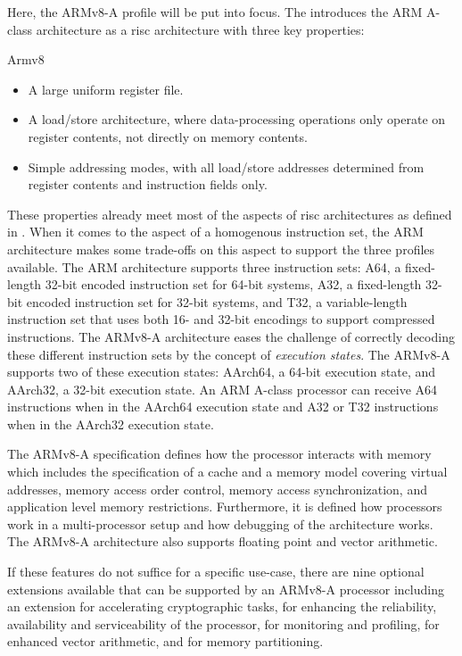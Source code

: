 Here, the ARMv8-A profile will be put into focus.
The  \cite{Armv8} introduces the ARM A-class architecture as a \gls{risc} architecture with three key properties:

\begin{displaycquote}[p.A1-34]{Armv8}
    \textelp{}
    \begin{itemize}
        \item A large uniform register file.
        \item A load/store architecture, where data-processing operations only operate on register contents, not directly on memory contents.
        \item Simple addressing modes, with all load/store addresses determined from register contents and instruction fields only.
    \end{itemize}
\end{displaycquote}

These properties already meet most of the aspects of \gls{risc} architectures as defined in \cite{Hennessy12}.
When it comes to the aspect of a homogenous instruction set, the ARM architecture makes some trade-offs on this aspect to support the three profiles available.
The ARM architecture supports three instruction sets: A64, a fixed-length 32-bit encoded instruction set for 64-bit systems, A32, a fixed-length 32-bit encoded instruction set for 32-bit systems, and T32, a variable-length instruction set that uses both 16- and 32-bit encodings to support compressed instructions.
The ARMv8-A architecture eases the challenge of correctly decoding these different instruction sets by the concept of \textit{execution states}.
The ARMv8-A supports two of these execution states: AArch64, a 64-bit execution state, and AArch32, a 32-bit execution state.
An ARM A-class processor can receive A64 instructions when in the AArch64 execution state and A32 or T32 instructions when in the AArch32 execution state.

The ARMv8-A specification defines how the processor interacts with memory which includes the specification of a cache and a memory model covering virtual addresses, memory access order control, memory access synchronization, and application level memory restrictions.
Furthermore, it is defined how processors work in a multi-processor setup and how debugging of the architecture works.
The ARMv8-A architecture also supports floating point and vector arithmetic.

If these features do not suffice for a specific use-case, there are nine optional extensions available that can be supported by an ARMv8-A processor including an extension for accelerating cryptographic tasks, for enhancing the reliability, availability and serviceability of the processor, for monitoring and profiling, for enhanced vector arithmetic, and for memory partitioning.

